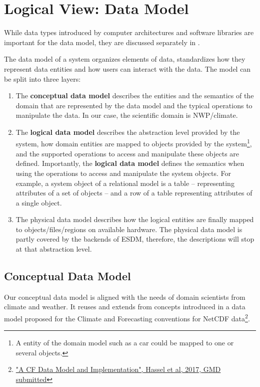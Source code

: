 \chapter{Logical View: Data Model}
\label{sec: viewpoints/logical/data model}

While data types introduced by computer architectures and software libraries are important for the data model, they are discussed separately in .

The data model of a system organizes elements of data, standardizes how they represent data entities and how users can interact with the data.
The model can be split into three layers:
\begin{enumerate}
	\item The \textbf{conceptual data model} describes the entities and the semantics of the domain that are represented by the data model and the typical operations to manipulate the data.
	In our case, the scientific domain is NWP/climate.
	\item The \textbf{logical data model} describes the abstraction level provided by the system, how domain entities are mapped to objects provided by the system\footnote{A entity of the domain model such as a car could be mapped to one or several objects.}, and the supported operations to access and manipulate these objects are defined.
	Importantly, the \textbf{logical data model} defines the semantics when using the operations to access and manipulate the system objects.
	For example, a system object of a relational model is a table -- representing attributes of a set of objects -- and a row of a table representing attributes of a single object.
	\item The physical data model describes how the logical entities are finally mapped to objects/files/regions on available hardware.
	The physical data model is partly covered by the backends of ESDM, therefore, the descriptions will stop at that abstraction level.
\end{enumerate}

\section{Conceptual Data Model}
\label{subsec: conceptual data model}

Our conceptual data model is aligned with the needs of domain scientists from climate and weather. It reuses and extends from concepts introduced in a data model proposed for the Climate and Forecasting conventions for NetCDF data\footnote {\url{"A CF Data Model and Implementation", Hassel et al, 2017, GMD submitted}}.

